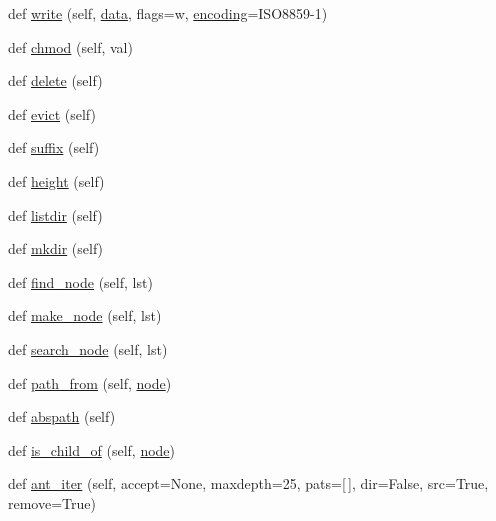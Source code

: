 \begin{DoxyCompactItemize}
\item 
def \hyperlink{classwaflib_1_1_node_1_1_node_a3e2f255b6614d98ff3f73903cc1a0439}{write} (self, \hyperlink{lib_2expat_8h_ac39e72a1de1cb50dbdc54b08d0432a24}{data}, flags=\textquotesingle{}w\textquotesingle{}, \hyperlink{structencoding}{encoding}=\textquotesingle{}I\+S\+O8859-\/1\textquotesingle{})
\item 
def \hyperlink{classwaflib_1_1_node_1_1_node_a7c69c9ee890bc2113f4f44c8b6d0aed5}{chmod} (self, val)
\item 
def \hyperlink{classwaflib_1_1_node_1_1_node_a5b15f6a29b5158a010fc78e7d2a4eef8}{delete} (self)
\item 
def \hyperlink{classwaflib_1_1_node_1_1_node_a31ebb3fd3aee8086605111ce83122453}{evict} (self)
\item 
def \hyperlink{classwaflib_1_1_node_1_1_node_a08a86be308b4ea7e209571274504852a}{suffix} (self)
\item 
def \hyperlink{classwaflib_1_1_node_1_1_node_a6f41a0f58447b1e67c4e4826e718f853}{height} (self)
\item 
def \hyperlink{classwaflib_1_1_node_1_1_node_a70c5530ee0dc91ddd80178d039c04d94}{listdir} (self)
\item 
def \hyperlink{classwaflib_1_1_node_1_1_node_a93340e13646660f3835b0c11e133bb64}{mkdir} (self)
\item 
def \hyperlink{classwaflib_1_1_node_1_1_node_a9ab508cb5f7d7069e8575d4d660c8379}{find\+\_\+node} (self, lst)
\item 
def \hyperlink{classwaflib_1_1_node_1_1_node_a347043d52fc2dee925ef027973e01134}{make\+\_\+node} (self, lst)
\item 
def \hyperlink{classwaflib_1_1_node_1_1_node_a67385f1721014aa606e2d7b25687a40f}{search\+\_\+node} (self, lst)
\item 
def \hyperlink{classwaflib_1_1_node_1_1_node_a2994cfc8043e1f27b8873e340a885788}{path\+\_\+from} (self, \hyperlink{structnode}{node})
\item 
def \hyperlink{classwaflib_1_1_node_1_1_node_aa0164267912895aeb986fdbfcf945159}{abspath} (self)
\item 
def \hyperlink{classwaflib_1_1_node_1_1_node_abc781098e2dcdd15feea5901ea2e23af}{is\+\_\+child\+\_\+of} (self, \hyperlink{structnode}{node})
\item 
def \hyperlink{classwaflib_1_1_node_1_1_node_a06da7a2c94996ada3d100721b5cf831e}{ant\+\_\+iter} (self, accept=None, maxdepth=25, pats=\mbox{[}$\,$\mbox{]}, dir=False, src=True, remove=True)
\item 

\end{DoxyCompactItemize}
